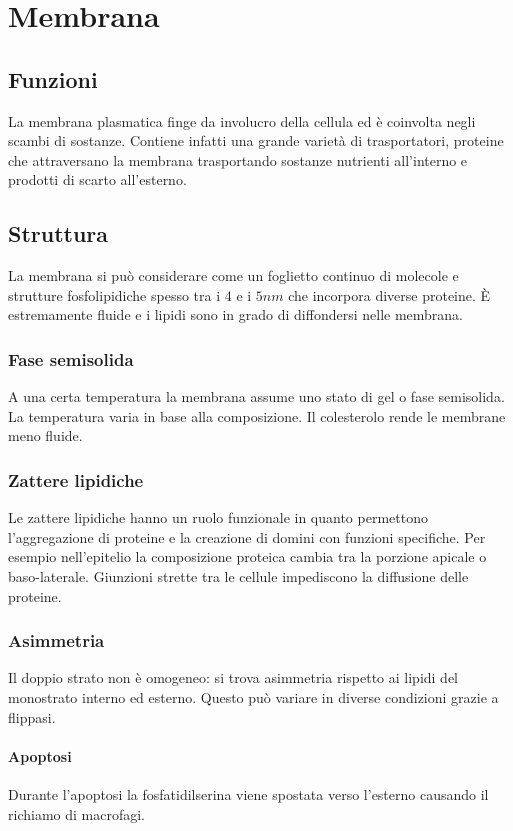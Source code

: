 \chapter{Membrana}

\section{Funzioni}
La membrana plasmatica finge da involucro della cellula ed \`e coinvolta negli scambi di sostanze.
Contiene infatti una grande variet\`a di trasportatori, proteine che attraversano la membrana trasportando sostanze nutrienti all'interno e prodotti di scarto all'esterno.

\section{Struttura}
La membrana si pu\`o considerare come un foglietto continuo di molecole e strutture fosfolipidiche spesso tra i $4$ e i $5nm$ che incorpora diverse proteine.
\`E estremamente fluide e i lipidi sono in grado di diffondersi nelle membrana.

	\subsection{Fase semisolida}
	A una certa temperatura la membrana assume uno stato di gel o fase semisolida.
	La temperatura varia in base alla composizione.
	Il colesterolo rende le membrane meno fluide.

	\subsection{Zattere lipidiche}
	Le zattere lipidiche hanno un ruolo funzionale in quanto permettono l'aggregazione di proteine e la creazione di domini con funzioni specifiche.
	Per esempio nell'epitelio la composizione proteica cambia tra la porzione apicale o baso-laterale.
	Giunzioni strette tra le cellule impediscono la diffusione delle proteine.

	\subsection{Asimmetria}
	Il doppio strato non \`e omogeneo: si trova asimmetria rispetto ai lipidi del monostrato interno ed esterno.
	Questo pu\`o variare in diverse condizioni grazie a flippasi.
	
		\subsubsection{Apoptosi}
		Durante l'apoptosi la fosfatidilserina viene spostata verso l'esterno causando il richiamo di macrofagi.

